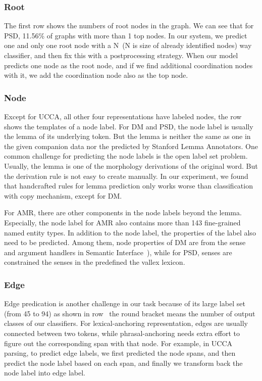 \subsubsection{Root}
\label{sssec:lex:root}

The first row  shows the numbers of root nodes in the graph.
We can see that for PSD, 11.56\% of graphs with more than 1 top
nodes. In our system, we predict one and only one root node with a
N~(N is size of already identified nodes) way classifier, and then fix
this with a postprocessing strategy. When our model predicts one node
as the root node, and if we find additional coordination nodes with
it, we add the coordination node also as the top node.

\subsubsection{Node}
\label{sssec:lex:node}

Except for UCCA, all other four representations have labeled
nodes, the row  shows the templates of a node label. For
DM and PSD, the node label is usually the lemma of its underlying
token. But the lemma is neither the same as one in the given companion
data nor the predicted by Stanford Lemma Annotators. One common
challenge for predicting the node labels is the open label set
problem. Usually, the lemma is one of the morphology derivations of
the original word. But the derivation rule is not easy to create
manually. In our experiment, we found that handcrafted rules for lemma
prediction only works worse than classification with copy mechanism,
except for DM.

For AMR, there are other components in the node labels beyond the
lemma. Especially, the node label for AMR also contains more than 143
fine-grained named entity types. In addition to the node label, the
properties of the label also need to be predicted. Among them, node
properties of DM are from the sense and argument handlers in Semantic
Interface~\citep[SEM-I,][]{Fli:Lon:Dyv:05}), while for PSD, senses are
constrained the senses in the predefined the vallex lexicon.

\subsubsection{Edge}
\label{sssec:lex:edge}

Edge predication is another challenge in our task because of its large
label set (from 45 to 94) as shown in row ~the
round bracket means the number of output classes of our
classifiers. For lexical-anchoring representation, edges are usually
connected between two tokens, while phrasal-anchoring needs extra
effort to figure out the corresponding span with that node. For
example, in UCCA parsing, to predict edge labels, we first predicted
the node spans, and then predict the node label based on each span,
and finally we transform back the node label into edge label.


